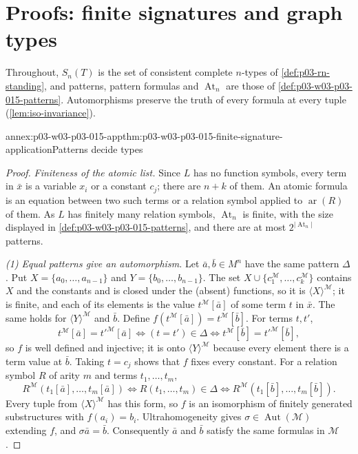 \section{Proofs: finite signatures and graph types}
\label{sec:annex-p03-w03-p03-015-finite-signature}

Throughout, \(S_n(T)\) is the set of consistent complete \(n\)-types of
\cref{def:p03-rn-standing}, and patterns, pattern formulas and
\(\operatorname{At}_n\) are those of \cref{def:p03-w03-p03-015-patterns}.
Automorphisms preserve the truth of every formula at every tuple
(\cref{lem:iso-invariance}).

\begin{annexitem}{annex:p03-w03-p03-015-app}{thm:p03-w03-p03-015-finite-signature-application}{Patterns decide types}
\begin{proof}
\emph{Finiteness of the atomic list.} Since \(L\) has no function
symbols, every term in \(\bar x\) is a variable \(x_i\) or a constant
\(c_j\); there are \(n+k\) of them. An atomic formula is an equation
between two such terms or a relation symbol applied to
\(\operatorname{ar}(R)\) of them. As \(L\) has finitely many relation
symbols, \(\operatorname{At}_n\) is finite, with the size displayed in
\cref{def:p03-w03-p03-015-patterns}, and there are at most
\(2^{|\operatorname{At}_n|}\) patterns.

\emph{(1) Equal patterns give an automorphism.} Let \(\bar a,\bar b\in M^n\)
have the same pattern \(\Delta\). Put \(X=\{a_0,\ldots,a_{n-1}\}\) and
\(Y=\{b_0,\ldots,b_{n-1}\}\). The set
\(X\cup\{c_1^{\mathcal M},\ldots,c_k^{\mathcal M}\}\) contains \(X\) and
the constants and is closed under the (absent) functions, so it is
\(\langle X\rangle^{\mathcal M}\); it is finite, and each of its elements
is the value \(t^{\mathcal M}[\bar a]\) of some term \(t\) in \(\bar x\).
The same holds for \(\langle Y\rangle^{\mathcal M}\) and \(\bar b\).
Define \(f(t^{\mathcal M}[\bar a])=t^{\mathcal M}[\bar b]\).
For terms \(t,t'\),
\[
 t^{\mathcal M}[\bar a]=t'^{\mathcal M}[\bar a]
 \iff(t=t')\in\Delta
 \iff t^{\mathcal M}[\bar b]=t'^{\mathcal M}[\bar b],
\]
so \(f\) is well defined and injective; it is onto
\(\langle Y\rangle^{\mathcal M}\) because every element there is a term
value at \(\bar b\). Taking \(t=c_j\) shows that \(f\) fixes every
constant. For a relation symbol \(R\) of arity \(m\) and terms
\(t_1,\ldots,t_m\),
\[
 R^{\mathcal M}(t_1[\bar a],\ldots,t_m[\bar a])
 \iff R(t_1,\ldots,t_m)\in\Delta
 \iff R^{\mathcal M}(t_1[\bar b],\ldots,t_m[\bar b]).
\]
Every tuple from \(\langle X\rangle^{\mathcal M}\) has this form, so \(f\)
is an isomorphism of finitely generated substructures with
\(f(a_i)=b_i\). Ultrahomogeneity gives \(\sigma\in\operatorname{Aut}(\mathcal M)\)
extending \(f\), and \(\sigma\bar a=\bar b\). Consequently \(\bar a\) and
\(\bar b\) satisfy the same formulas in \(\mathcal M\).


\end{proof}
\end{annexitem}
